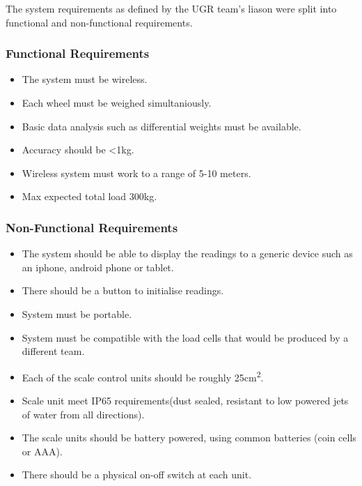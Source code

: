 The system requirements as defined by the UGR team's liason were split into functional and non-functional requirements.

\subsubsection{Functional Requirements}
\label{functional}
\begin{itemize}
\item The system must be wireless.
\item Each wheel must be weighed simultaniously.
\item Basic data analysis such as differential weights must be available.
\item Accuracy should be \textless 1kg.
\item Wireless system must work to a range of 5-10 meters.
\item Max expected total load 300kg.
\end{itemize}

\subsubsection{Non-Functional Requirements}
\label{non-functional}
\begin{itemize}
\item The system should be able to display the readings to a generic device such as an iphone, android phone or tablet. 
\item There should be a button to initialise readings.
\item System must be portable.
\item System must be compatible with the load cells that would be produced by a different team.
\item Each of the scale control units should be roughly 25cm\textsuperscript{2}.
\item Scale unit meet IP65 requirements(dust sealed, resistant to low powered jets of water from all directions).
\item The scale units should be battery powered, using common batteries (coin cells or AAA).
\item There should be a physical on-off switch at each unit.
\end{itemize}